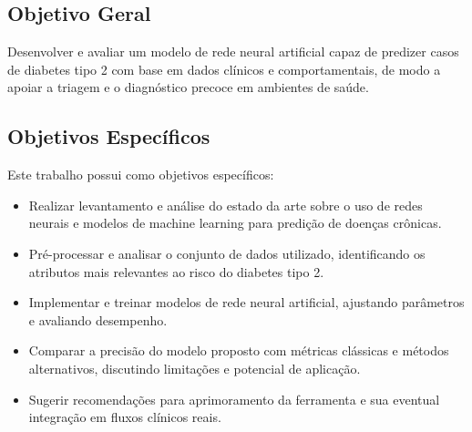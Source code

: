 \subsection{Objetivo Geral}
Desenvolver e avaliar um modelo de rede neural artificial capaz de predizer casos de diabetes tipo 2 com base em dados clínicos e comportamentais, de modo a apoiar a triagem e o diagnóstico precoce em ambientes de saúde.

\subsection{Objetivos Específicos}
Este trabalho possui como objetivos específicos:
\begin{itemize}
    \item Realizar levantamento e análise do estado da arte sobre o uso de redes neurais e modelos de machine learning para predição de doenças crônicas.
    \item Pré-processar e analisar o conjunto de dados utilizado, identificando os atributos mais relevantes ao risco do diabetes tipo 2.
    \item Implementar e treinar modelos de rede neural artificial, ajustando parâmetros e avaliando desempenho.
    \item Comparar a precisão do modelo proposto com métricas clássicas e métodos alternativos, discutindo limitações e potencial de aplicação.
    \item Sugerir recomendações para aprimoramento da ferramenta e sua eventual integração em fluxos clínicos reais.
\end{itemize}